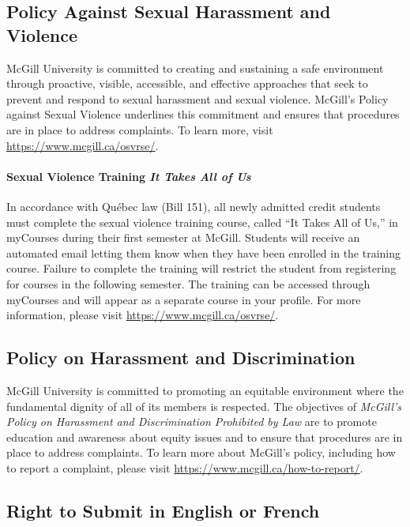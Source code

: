 \documentclass{article}
\begin{document}
\subsection{Policy Against Sexual Harassment and Violence}

McGill University is committed to creating and sustaining a safe
environment through proactive, visible, accessible, and effective
approaches that seek to prevent and respond to sexual harassment and
sexual violence. McGill's Policy against Sexual Violence underlines
this commitment and ensures that procedures are in place to address
complaints. To learn more, visit \url{https://www.mcgill.ca/osvrse/}.

\paragraph{Sexual Violence Training {\em It Takes All of Us}}

In accordance with Québec law (Bill 151), all newly admitted credit students
must complete the sexual violence training course, called ``It Takes
All of Us,'' in myCourses during their first semester at
McGill. Students will receive an automated email letting them know
when they have been enrolled in the training course. Failure to
complete the training will restrict the student from registering for
courses in the following semester. The training can be accessed
through myCourses and will appear as a separate course in your
profile. For more information, please visit \url{https://www.mcgill.ca/osvrse/}.

\subsection{Policy on Harassment and Discrimination}

McGill University is committed to promoting an equitable environment
where the fundamental dignity of all of its members is respected. The
objectives of {\em McGill's Policy on Harassment and Discrimination
Prohibited by Law} are to promote education and awareness about equity
issues and to ensure that procedures are in place to address
complaints. To learn more about McGill's policy, including how to
report a complaint, please visit
\url{https://www.mcgill.ca/how-to-report/}.

\subsection{Right to Submit in English or French}
\end{document}
